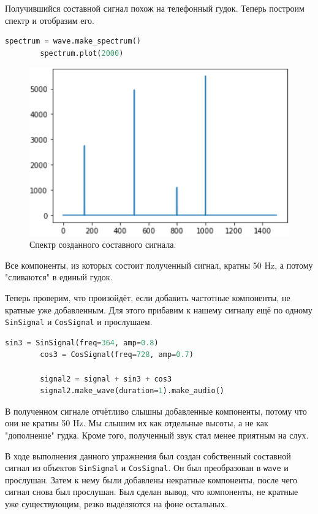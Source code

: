 \documentclass[a4paper, 14pt]{extarticle}
\begin{document}
    Получившийся составной сигнал похож на телефонный гудок. Теперь построим спектр и отобразим его.

    \begin{lstlisting}[language=Python, caption= Создание спектра., label={lst:task3_spectrum}]
        spectrum = wave.make_spectrum()
        spectrum.plot(2000)
    \end{lstlisting}

    \begin{figure}[h]
        \centering
        \includegraphics[width=0.8\linewidth]{task3_spectrum}
        \caption{Спектр созданного составного сигнала.}
        \label{fig:task3_spectrum}
    \end{figure}

    Все компоненты, из которых состоит полученный сигнал, кратны 50 Hz, а потому "сливаются" в единый гудок.

    Теперь проверим, что произойдёт, если добавить частотные компоненты, не кратные уже добавленным.
    Для этого прибавим к нашему сигналу ещё по одному \texttt{SinSignal} и \texttt{CosSignal} и прослушаем.

    \begin{lstlisting}[language=Python, caption= Добавление некратных компонент., label={lst:task3_spectrum_update}]
        sin3 = SinSignal(freq=364, amp=0.8)
        cos3 = CosSignal(freq=728, amp=0.7)

        signal2 = signal + sin3 + cos3
        signal2.make_wave(duration=1).make_audio()
    \end{lstlisting}

    В полученном сигнале отчётливо слышны добавленные компоненты, потому что они не кратны 50 Hz.
    Мы слышим их как отдельные высоты, а не как "дополнение" гудка. Кроме того, полученный звук стал менее приятным на слух.

    В ходе выполнения данного упражнения был создан собственный составной сигнал из объектов \texttt{SinSignal} и \texttt{CosSignal}.
    Он был преобразован в \texttt{wave} и прослушан.
    Затем к нему были добавлены некратные компоненты, после чего сигнал снова был прослушан.
    Был сделан вывод, что компоненты, не кратные уже существующим, резко выделяются на фоне остальных.
\end{document}
